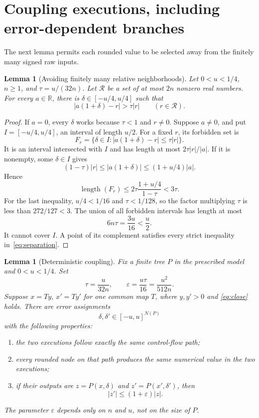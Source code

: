 \documentclass[11pt,a4paper]{article}
\numberwithin{equation}{section}
\newtheorem{lemma}[theorem]{Lemma}
\theoremstyle{definition}
\theoremstyle{remark}
\newcommand{\R}{\mathbb R}
\newcommand{\abs}[1]{\left|#1\right|}
\begin{document}
\section{Coupling executions, including error-dependent branches}
\label{sec:coupling}

The next lemma permits each rounded value to be selected away from the
finitely many signed raw inputs.

\begin{lemma}[Avoiding finitely many relative neighborhoods]
\label{lem:avoid}
Let $0<u<1/4$, $n\ge1$, and $\tau=u/(32n)$.  Let $\mathcal R$ be a set
of at most $2n$ nonzero real numbers.  For every $a\in\R$, there is
$\delta\in[-u/4,u/4]$ such that
\begin{equation}\label{eq:separation}
 \abs{a(1+\delta)-r}>\tau\abs r
 \qquad(r\in\mathcal R).
\end{equation}
\end{lemma}

\begin{proof}
If $a=0$, every $\delta$ works because $\tau<1$ and $r\ne0$.
Suppose $a\ne0$, and put $I=[-u/4,u/4]$, an interval of length $u/2$.
For a fixed $r$, its forbidden set is
\[
 F_r=\{\delta\in I:\abs{a(1+\delta)-r}\le\tau\abs r\}.
\]
It is an interval intersected with $I$ and has length at most
$2\tau\abs r/\abs a$.  If it is nonempty, some $\delta\in I$ gives
\[
 (1-\tau)\abs r\le\abs{a(1+\delta)}
 \le(1+u/4)\abs a.
\]
Hence
\[
 \operatorname{length}(F_r)
 \le2\tau\frac{1+u/4}{1-\tau}<3\tau.
\]
For the last inequality, $u/4<1/16$ and $\tau<1/128$, so the factor
multiplying $\tau$ is less than $272/127<3$.
The union of all forbidden intervals has length at most
\[
 6n\tau=\frac{3u}{16}<\frac u2.
\]
It cannot cover $I$.  A point of its complement satisfies every strict
inequality in~\eqref{eq:separation}.
\end{proof}

\begin{lemma}[Deterministic coupling]\label{lem:coupling}
Fix a finite tree $P$ in the prescribed model and $0<u<1/4$.  Set
\begin{equation}\label{eq:parameters}
 \tau=\frac{u}{32n},\qquad
 \varepsilon=\frac{u\tau}{16}=\frac{u^2}{512n}.
\end{equation}
Suppose $x=Ty$, $x'=Ty'$ for one common map $T$, where $y,y'>0$ and
\eqref{eq:close} holds.  There are error assignments
\[
 \delta,\delta'\in[-u,u]^{N(P)}
\]
with the following properties:
\begin{enumerate}[label=\textup{(\roman*)}]
\item the two executions follow exactly the same control-flow path;
\item every rounded node on that path produces the same numerical value
in the two executions;
\item if their outputs are $z=P(x,\delta)$ and $z'=P(x',\delta')$, then
\begin{equation}\label{eq:outputcoupling}
 \abs{z'}\le(1+\varepsilon)\abs z.
\end{equation}
\end{enumerate}
The parameter $\varepsilon$ depends only on $n$ and $u$, not on the size
of $P$.
\end{lemma}
\end{document}
